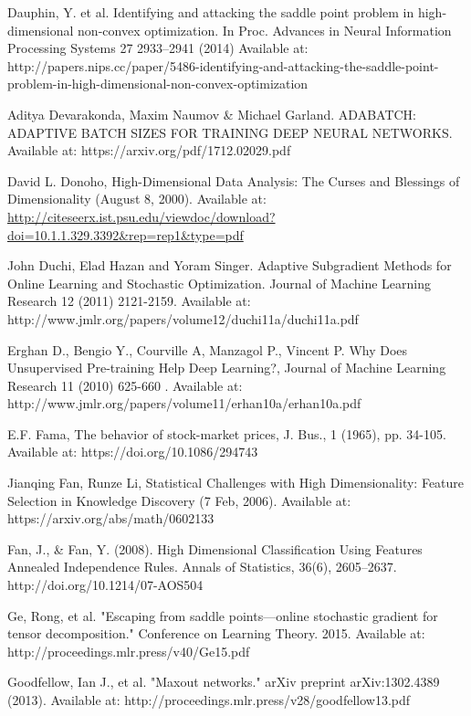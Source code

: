 \documentclass[a4paper,11pt,oneside]{article}
\theoremstyle{plain}
\theoremstyle{definition}
\begin{document}
\begin{thebibliography}{bibliography}
Dauphin, Y. et al. Identifying and attacking the saddle point problem in high-dimensional non-convex optimization. In Proc. Advances in Neural Information Processing Systems 27 2933–2941 (2014)
Available at: http://papers.nips.cc/paper/5486-identifying-and-attacking-the-saddle-point-problem-in-high-dimensional-non-convex-optimization 

Aditya Devarakonda, Maxim Naumov \& Michael Garland. ADABATCH: ADAPTIVE BATCH SIZES FOR TRAINING
DEEP NEURAL NETWORKS. Available at: https://arxiv.org/pdf/1712.02029.pdf

David L. Donoho, High-Dimensional Data Analysis: The Curses and Blessings of 
Dimensionality (August 8, 2000). Available at: \url{http://citeseerx.ist.psu.edu/viewdoc/download?doi=10.1.1.329.3392&rep=rep1&type=pdf}

John Duchi, Elad Hazan and Yoram Singer. Adaptive Subgradient Methods for
Online Learning and Stochastic Optimization. Journal of Machine Learning Research 12 (2011) 
2121-2159. Available at: http://www.jmlr.org/papers/volume12/duchi11a/duchi11a.pdf

Erghan D., Bengio Y., Courville A, Manzagol P., Vincent P. Why Does Unsupervised Pre-training Help Deep 
Learning?, Journal of Machine Learning Research 11 (2010) 625-660 . Available 
at: http://www.jmlr.org/papers/volume11/erhan10a/erhan10a.pdf

E.F. Fama, The behavior of stock-market prices, J. Bus., 1 (1965), pp. 34-105. 
Available at: https://doi.org/10.1086/294743

Jianqing Fan, Runze Li, 
Statistical Challenges with High Dimensionality: Feature Selection in Knowledge Discovery 
(7 Feb, 2006). Available at: https://arxiv.org/abs/math/0602133

Fan, J., \& Fan, Y. (2008). High Dimensional Classification Using Features Annealed Independence Rules. Annals of Statistics, 36(6), 2605–2637. http://doi.org/10.1214/07-AOS504

Ge, Rong, et al. "Escaping from saddle points—online stochastic gradient for tensor decomposition." Conference on Learning Theory. 2015.
Available at: http://proceedings.mlr.press/v40/Ge15.pdf 

Goodfellow, Ian J., et al. "Maxout networks." arXiv preprint arXiv:1302.4389 (2013).
Available at: http://proceedings.mlr.press/v28/goodfellow13.pdf


\end{thebibliography}
\end{document}

